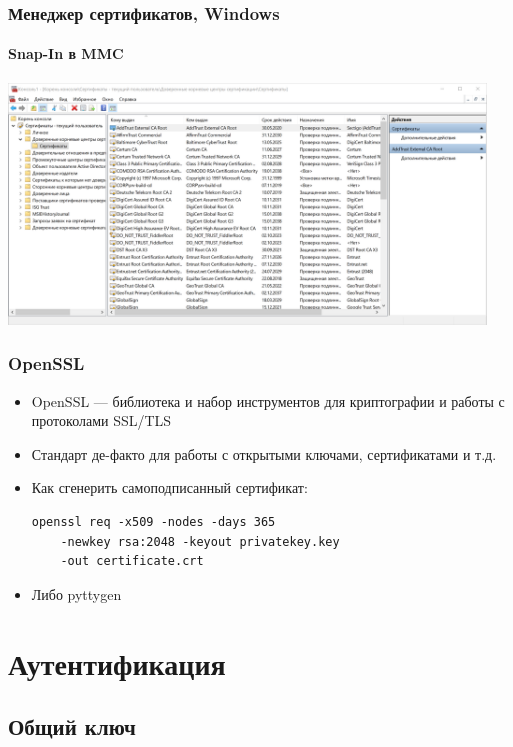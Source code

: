 \documentclass[xetex,mathserif,serif]{beamer}
\begin{document}
    \begin{frame}
        \frametitle{Менеджер сертификатов, Windows}
        \framesubtitle{Snap-In в MMC}
        \begin{center}
            \includegraphics[width=0.95\textwidth]{windowsCertManager.png}
        \end{center}
    \end{frame}

    \begin{frame}[fragile]
        \frametitle{OpenSSL}
        \begin{itemize}
            \item OpenSSL --- библиотека и набор инструментов для криптографии и работы с протоколами SSL/TLS
            \item Стандарт де-факто для работы с открытыми ключами, сертификатами и т.д.
            \item Как сгенерить самоподписанный сертификат:
            
                \begin{verbatim}
openssl req -x509 -nodes -days 365 
    -newkey rsa:2048 -keyout privatekey.key 
    -out certificate.crt
                \end{verbatim}
            \item Либо pyttygen
        \end{itemize}
    \end{frame}

    \section{Аутентификация}

    \subsection{Общий ключ}
\end{document}
